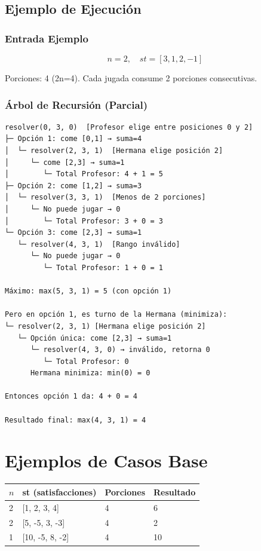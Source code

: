 \documentclass[12pt,letterpaper]{article}
\begin{document}
\subsection{Ejemplo de Ejecución}

\subsubsection{Entrada Ejemplo}

\[
n = 2, \quad st = [3, 1, 2, -1]
\]

Porciones: 4 (2n=4). Cada jugada consume 2 porciones consecutivas.

\subsubsection{Árbol de Recursión (Parcial)}

\begin{verbatim}
resolver(0, 3, 0)  [Profesor elige entre posiciones 0 y 2]
├─ Opción 1: come [0,1] → suma=4
│  └─ resolver(2, 3, 1)  [Hermana elige posición 2]
│     └─ come [2,3] → suma=1
│        └─ Total Profesor: 4 + 1 = 5
├─ Opción 2: come [1,2] → suma=3
│  └─ resolver(3, 3, 1)  [Menos de 2 porciones]
│     └─ No puede jugar → 0
│        └─ Total Profesor: 3 + 0 = 3
└─ Opción 3: come [2,3] → suma=1
   └─ resolver(4, 3, 1)  [Rango inválido]
      └─ No puede jugar → 0
         └─ Total Profesor: 1 + 0 = 1

Máximo: max(5, 3, 1) = 5 (con opción 1)

Pero en opción 1, es turno de la Hermana (minimiza):
└─ resolver(2, 3, 1) [Hermana elige posición 2]
   └─ Opción única: come [2,3] → suma=1
      └─ resolver(4, 3, 0) → inválido, retorna 0
         └─ Total Profesor: 0
      Hermana minimiza: min(0) = 0

Entonces opción 1 da: 4 + 0 = 4

Resultado final: max(4, 3, 1) = 4
\end{verbatim}

\section{Ejemplos de Casos Base}

\begin{table}[h]
\centering
\begin{tabular}{|p{2cm}|p{3cm}|p{2cm}|p{2cm}|}
\hline
\textbf{$n$} & \textbf{st (satisfacciones)} & \textbf{Porciones} & \textbf{Resultado} \\
\hline
2 & [1, 2, 3, 4] & 4 & 6 \\
\hline
2 & [5, -5, 3, -3] & 4 & 2 \\
\hline
1 & [10, -5, 8, -2] & 4 & 10 \\
\hline
\end{tabular}
\end{table}
\end{document}
